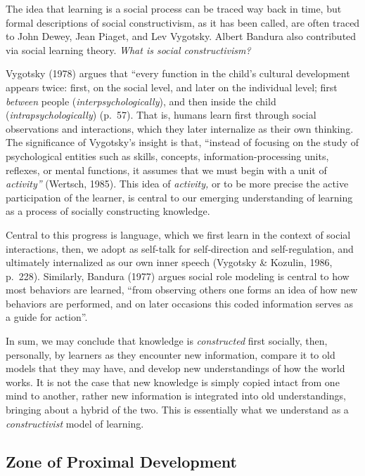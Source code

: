 \documentclass[
]{book}
\begin{document}
The idea that learning is a social process can be traced way back in time, but formal descriptions of social constructivism, as it has been called, are often traced to John Dewey, Jean Piaget, and Lev Vygotsky. Albert Bandura also contributed via social learning theory. \emph{What is social constructivism?}

Vygotsky (1978) argues that ``every function in the child's cultural development appears twice: first, on the social level, and later on the individual level; first \emph{between} people (\emph{interpsychologically}), and then inside the child (\emph{intrapsychologically}) (p.~57). That is, humans learn first through social observations and interactions, which they later internalize as their own thinking. The significance of Vygotsky's insight is that, ``instead of focusing on the study of psychological entities such as skills, concepts, information-processing units, reflexes, or mental functions, it assumes that we must begin with a unit of \emph{activity''} (Wertsch, 1985). This idea of \emph{activity,} or to be more precise the active participation of the learner, is central to our emerging understanding of learning as a process of socially constructing knowledge.

Central to this progress is language, which we first learn in the context of social interactions, then, we adopt as self-talk for self-direction and self-regulation, and ultimately internalized as our own inner speech (Vygotsky \& Kozulin, 1986, p.~228). Similarly, Bandura (1977) argues social role modeling is central to how most behaviors are learned, ``from observing others one forms an idea of how new behaviors are performed, and on later occasions this coded information serves as a guide for action''.

In sum, we may conclude that knowledge is \emph{constructed} first socially, then, personally, by learners as they encounter new information, compare it to old models that they may have, and develop new understandings of how the world works. It is not the case that new knowledge is simply copied intact from one mind to another, rather new information is integrated into old understandings, bringing about a hybrid of the two. This is essentially what we understand as a \emph{constructivist} model of learning.

\hypertarget{zone-of-proximal-development}{%
\subsection*{Zone of Proximal Development}\label{zone-of-proximal-development}}
\end{document}
